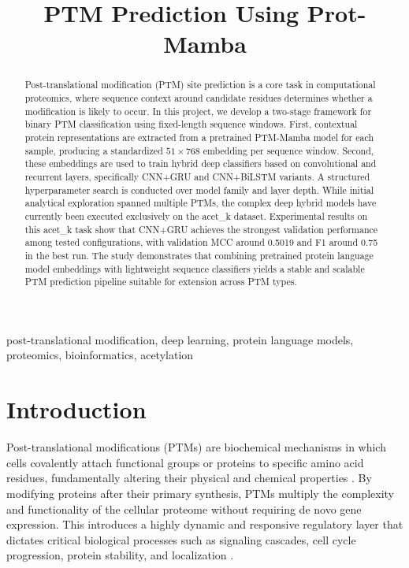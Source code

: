 \documentclass[conference]{IEEEtran}
\begin{document}
\title{PTM Prediction Using Prot-Mamba}

\author{
}

\maketitle

\begin{abstract}
Post-translational modification (PTM) site prediction is a core task in computational proteomics, where sequence context around candidate residues determines whether a modification is likely to occur. In this project, we develop a two-stage framework for binary PTM classification using fixed-length sequence windows. First, contextual protein representations are extracted from a pretrained PTM-Mamba model for each sample, producing a standardized $51 \times 768$ embedding per sequence window. Second, these embeddings are used to train hybrid deep classifiers based on convolutional and recurrent layers, specifically CNN+GRU and CNN+BiLSTM variants. A structured hyperparameter search is conducted over model family and layer depth. While initial analytical exploration spanned multiple PTMs, the complex deep hybrid models have currently been executed exclusively on the acet\_k dataset. Experimental results on this acet\_k task show that CNN+GRU achieves the strongest validation performance among tested configurations, with validation MCC around 0.5019 and F1 around 0.75 in the best run. The study demonstrates that combining pretrained protein language model embeddings with lightweight sequence classifiers yields a stable and scalable PTM prediction pipeline suitable for extension across PTM types.
\end{abstract}

\begin{IEEEkeywords}
post-translational modification, deep learning, protein language models, proteomics, bioinformatics, acetylation
\end{IEEEkeywords}

\section{Introduction}

Post-translational modifications (PTMs) are biochemical mechanisms in which cells covalently attach functional groups or proteins to specific amino acid residues, fundamentally altering their physical and chemical properties \cite{zhong2023ptm}. By modifying proteins after their primary synthesis, PTMs multiply the complexity and functionality of the cellular proteome without requiring de novo gene expression. This introduces a highly dynamic and responsive regulatory layer that dictates critical biological processes such as signaling cascades, cell cycle progression, protein stability, and localization \cite{li2022dbptm}.
\end{document}
